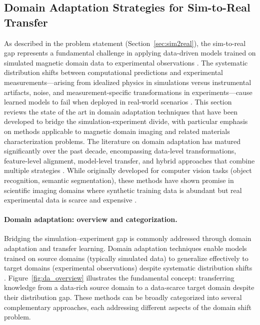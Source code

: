 \documentclass[letterpaper, 12, one column]{article}
\begin{document}
\subsection{Domain Adaptation Strategies for Sim-to-Real Transfer}
\label{sec:domain_adaptation_sota}

As described in the problem statement (Section~\ref{sec:sim2real}), the sim-to-real gap represents a fundamental challenge in applying data-driven models trained on simulated magnetic domain data to experimental observations \cite{Hilgers2025}. The systematic distribution shifts between computational predictions and experimental measurements—arising from idealized physics in simulations versus instrumental artifacts, noise, and measurement-specific transformations in experiments—cause learned models to fail when deployed in real-world scenarios \cite{Feng2024}. This section reviews the state of the art in domain adaptation techniques that have been developed to bridge the simulation-experiment divide, with particular emphasis on methods applicable to magnetic domain imaging and related materials characterization problems. The literature on domain adaptation has matured significantly over the past decade, encompassing data-level transformations, feature-level alignment, model-level transfer, and hybrid approaches that combine multiple strategies \cite{Wilson2020Survey}. While originally developed for computer vision tasks (object recognition, semantic segmentation), these methods have shown promise in scientific imaging domains where synthetic training data is abundant but real experimental data is scarce and expensive \cite{Sim2RealReview2021}.

\paragraph{Domain adaptation: overview and categorization.}
Bridging the simulation–experiment gap is commonly addressed through domain adaptation and transfer learning. Domain adaptation techniques enable models trained on source domains (typically simulated data) to generalize effectively to target domains (experimental observations) despite systematic distribution shifts \cite{Wilson2020Survey}. Figure~\ref{fig:da_overview} illustrates the fundamental concept: transferring knowledge from a data-rich source domain to a data-scarce target domain despite their distribution gap. These methods can be broadly categorized into several complementary approaches, each addressing different aspects of the domain shift problem.
\end{document}

